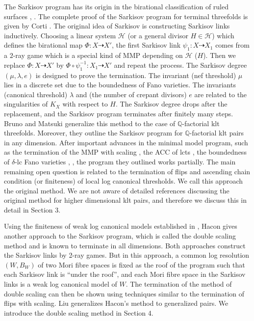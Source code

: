 \documentclass[11pt]{amsart}
\begin{document}
The Sarkisov program has its origin in the birational classification of ruled surfaces \cite{sarkisovBIRATIONALAUTOMORPHISMSCONIC1981}, \cite{sarkisovCONICBUNDLESTRUCTURES1983}.
The complete proof of the Sarkisov program for terminal threefolds is given by Corti \cite{cortiFactoringBirationalMaps}.
The original idea of Sarkisov is constructing Sarkisov links inductively. 
Choosing a linear system $\mathcal{H}$ (or a general divisor $H \in \mathcal{H}$) which defines the birational map $\Phi:X \dashrightarrow X'$, the first Sarkisov link $\psi_1:X\dashrightarrow X_1$ comes from a $2$-ray game which is a special kind of MMP depending on $\mathcal{H}$ ($H$). 
Then we replace $\Phi:X\dashrightarrow X'$ by $\Phi\circ \psi_1^{-1}: X_1 \dashrightarrow X'$ and repeat the process. 
The Sarkisov degree $(\mu,\lambda,e)$ is designed to prove the termination. The invariant (nef threshold) $\mu$ lies in a discrete set due  to the boundedness of Fano varieties. The invariants (canonical threshold) $\lambda$ and (the number of crepant divisors) $e$ are related to the singularities of $K_X$ with respect to $H$. 
The Sarkisov degree drops after the replacement, and the Sarkisov program terminates after finitely many steps. 
Bruno and Matsuki \cite{brunoLogSarkisovProgram1995} generalize this method to the case of $\mathbb{Q}$-factorial klt threefolds. Moreover, they outline the Sarkisov program for $\mathbb{Q}$-factorial klt pairs in any dimension.
After important advances in the minimal model program, such as the termination of the MMP with scaling \cite{BCHM10}, the ACC of lcts \cite{HMX14}, the boundedness of $\delta$-lc Fano varieties \cite{Bir19}, \cite{birkarSingularitiesLinearSystems2020}, the program they outlined works partially. The main remaining open question is related to the termination of flips and ascending chain condition (or finiteness) of local log canonical thresholds.
We call this approach the original method. We are not aware of detailed references discussing the original method for higher dimensional klt pairs, and therefore we discuss this in detail in Section 3. 

Using the finiteness of weak log canonical models established in \cite{BCHM10}, Hacon \cite{haconMinimalModelProgram2012} gives another approach to the Sarkisov program, which is called the double scaling method and is known to terminate in all dimensions. 
Both approaches construct the Sarkisov links by 2-ray games. 
But in this approach, a common log resolution $(W,B_W)$ of two Mori fibre spaces is fixed as the roof of the program such that each Sarkisov link is ``under the roof'', and each Mori fibre space in the Sarkisov links is a weak log canonical model of $W$. 
The termination of the method of double scaling can then be shown using techniques similar to the termination of flips with scaling.
Liu \cite{liuSarkisovProgramGeneralized2021} generalizes Hacon's method to generalized pairs.
 We introduce the double scaling method in Section 4.
\end{document}
